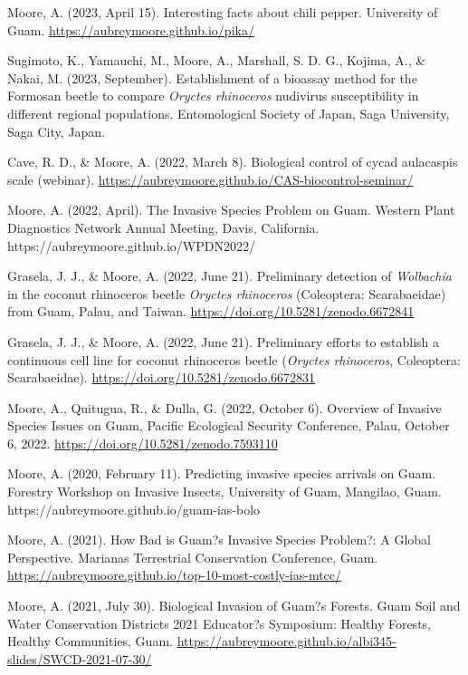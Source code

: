 \documentclass[12pt,english]{simplecv}
\begin{document}
\begin{thebibliography}{999}


\bibitem{} Moore, A. (2023, April 15). Interesting facts about chili pepper. University of Guam. \url{https://aubreymoore.github.io/pika/}

\bibitem{} Sugimoto, K., Yamauchi, M., Moore, A., Marshall, S. D. G., Kojima, A., \& Nakai, M. (2023, September). Establishment of a bioassay method for the Formosan beetle to compare \textit{Oryctes rhinoceros} nudivirus susceptibility in different regional populations. Entomological Society of Japan, Saga University, Saga City, Japan.

\bibitem{} Cave, R. D., \& Moore, A. (2022, March 8). Biological control of cycad aulacaspis scale (webinar). \url{https://aubreymoore.github.io/CAS-biocontrol-seminar/}

\bibitem{} Moore, A. (2022, April). The Invasive Species Problem on Guam. Western Plant Diagnostics Network Annual Meeting, Davis, California. https://aubreymoore.github.io/WPDN2022/

\bibitem{} Grasela, J. J., \& Moore, A. (2022, June 21). Preliminary detection of \textit{Wolbachia} in the coconut rhinoceros beetle \textit{Oryctes rhinoceros} (Coleoptera: Scarabaeidae) from Guam, Palau, and Taiwan. \url{https://doi.org/10.5281/zenodo.6672841}

\bibitem{} Grasela, J. J., \& Moore, A. (2022, June 21). Preliminary efforts to establish a continuous cell line for coconut rhinoceros beetle (\textit{Oryctes rhinoceros}, Coleoptera: Scarabaeidae). \url{https://doi.org/10.5281/zenodo.6672831}

\bibitem{} Moore, A., Quitugua, R., \& Dulla, G. (2022, October 6). Overview of Invasive Species Issues on Guam, Pacific Ecological Security Conference, Palau, October 6, 2022. \url{https://doi.org/10.5281/zenodo.7593110}


\bibitem{} Moore, A. (2020, February 11). Predicting invasive species arrivals on Guam. Forestry Workshop on Invasive Insects, University of Guam, Mangilao, Guam. https://aubreymoore.github.io/guam-ias-bolo

\bibitem{} Moore, A. (2021). How Bad is Guam?s Invasive Species Problem?: A Global Perspective. Marianas Terrestrial Conservation Conference, Guam. \url{https://aubreymoore.github.io/top-10-most-costly-ias-mtcc/}

\bibitem{} Moore, A. (2021, July 30). Biological Invasion of Guam?s Forests. Guam Soil and Water Conservation Districts 2021 Educator?s Symposium: Healthy Forests, Healthy Communities, Guam. \url{https://aubreymoore.github.io/albi345-slides/SWCD-2021-07-30/}


\end{thebibliography}
\end{document}
